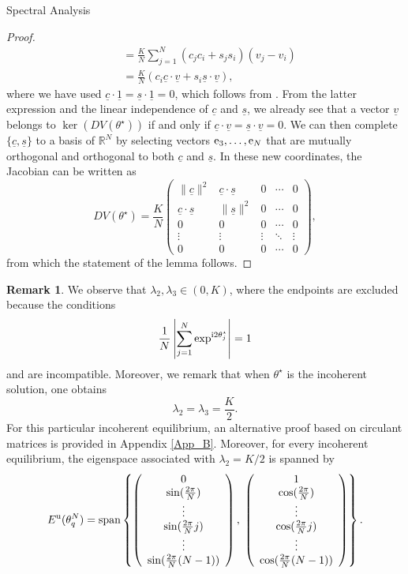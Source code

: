 \documentclass{article}
\theoremstyle{definition}
\newtheorem{rk}{Remark}[section]
\newcommand{\R}{\mathbb{R}}
\newcommand{\e}{\textnormal{e}}
\renewcommand{\u}{\textnormal{u}}
\renewcommand{\i}{\textnormal{i}}
\begin{document}
\begin{section}{Spectral Analysis}
\begin{proof}
\begin{align*}
        &=\frac{K}{N}\sum_{j=1}^N(c_jc_i+s_js_i)(v_j-v_i)\\
        &=\frac{K}{N}(c_i\underline{c}\cdot\underline{v}+s_i\underline{s}\cdot\underline{v}),
        \end{align*}
where we have used $\underline{c}\cdot\underline{1}=\underline{s}\cdot\underline{1}=0$, which follows from . From the latter expression and the linear independence of $\underline{c}$ and $\underline{s}$, we already see that a vector $\underline{v}$ belongs to $\operatorname{ker}(DV(\theta^\star))$ if and only if $\underline{c}\cdot\underline{v}=\underline{s}\cdot\underline{v}=0$. We can then complete $\{\underline{c},\underline{s}\}$ to a basis of $\R^N$ by selecting vectors $\e_3,\ldots,\e_N$ that are mutually orthogonal and orthogonal to both $\underline{c}$ and $\underline{s}$. In these new coordinates, the Jacobian can be written as
$$DV(\theta^\star)=\frac{K}{N}\left(\begin{array}{ccccc}
\|\underline{c}\|^2 & \underline{c}\cdot\underline{s} & 0 & \cdots & 0 \\
\underline{c}\cdot\underline{s} & \|\underline{s}\|^2 & 0 & \cdots & 0 \\
0 & 0 & 0 & \cdots & 0 \\
\vdots & \vdots & \vdots & \ddots & \vdots \\
0 & 0 & 0 & \cdots & 0
\end{array}\right),$$
from which the statement of the lemma follows.
\end{proof}

\begin{rk}\label{rk_eigenspace}
    We observe that $\lambda_2,\lambda_3\in(0,K)$, where the endpoints are excluded because the conditions
$$\frac{1}{N}\left|\sum_{j=1}^N\exp^{\i2\theta^\star_j}\right|=1$$
and  are incompatible. Moreover, we remark that when $\theta^\star$ is the incoherent solution, one obtains
$$\lambda_2=\lambda_3=\frac{K}{2}.$$
For this particular incoherent equilibrium, an alternative proof based on circulant matrices is provided in Appendix \ref{App_B}. Moreover, for every incoherent equilibrium, the eigenspace associated with $\lambda_2=K/2$ is spanned by
$$E^\u(\theta^N_q)=\operatorname{span}\left\{\left(\begin{array}{c}
0 \\
\sin(\frac{2\pi}{N})\\
\vdots \\
\sin(\frac{2\pi}{N}j)\\
\vdots \\
\sin(\frac{2\pi}{N}(N-1))
\end{array}\right),\;\left(\begin{array}{c}
1 \\
\cos(\frac{2\pi}{N})\\
\vdots \\
\cos(\frac{2\pi}{N}j)\\
\vdots \\
\cos(\frac{2\pi}{N}(N-1))
\end{array}\right)\right\}.$$
\end{rk}


\end{section}
\end{document}
